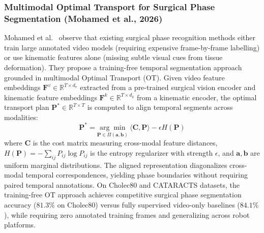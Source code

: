 \subsubsection{Multimodal Optimal Transport for Surgical Phase Segmentation (Mohamed et al., 2026)}
Mohamed et al.~\cite{Mohamed2026SurgOT} observe that existing surgical phase recognition methods either train large annotated video models (requiring expensive frame-by-frame labelling) or use kinematic features alone (missing subtle visual cues from tissue deformation). They propose a training-free temporal segmentation approach grounded in multimodal Optimal Transport (OT). Given video feature embeddings $\mathbf{F}^v \in \mathbb{R}^{T \times d_v}$ extracted from a pre-trained surgical vision encoder and kinematic feature embeddings $\mathbf{F}^k \in \mathbb{R}^{T \times d_k}$ from a kinematic encoder, the optimal transport plan $\mathbf{P}^* \in \mathbb{R}^{T \times T}$ is computed to align temporal segments across modalities:
\begin{equation}
    \mathbf{P}^* = \underset{\mathbf{P} \in \Pi(\mathbf{a}, \mathbf{b})}{\arg\min}\ \langle \mathbf{C}, \mathbf{P} \rangle - \epsilon H(\mathbf{P})
\end{equation}
where $\mathbf{C}$ is the cost matrix measuring cross-modal feature distances, $H(\mathbf{P}) = -\sum_{ij} P_{ij}\log P_{ij}$ is the entropy regularizer with strength $\epsilon$, and $\mathbf{a}, \mathbf{b}$ are uniform marginal distributions. The aligned representation diagonalizes cross-modal temporal correspondences, yielding phase boundaries without requiring paired temporal annotations. On Cholec80 and CATARACTS datasets, the training-free OT approach achieves competitive surgical phase segmentation accuracy ($81.3\%$ on Cholec80) versus fully supervised video-only baselines ($84.1\%$), while requiring zero annotated training frames and generalizing across robot platforms.

